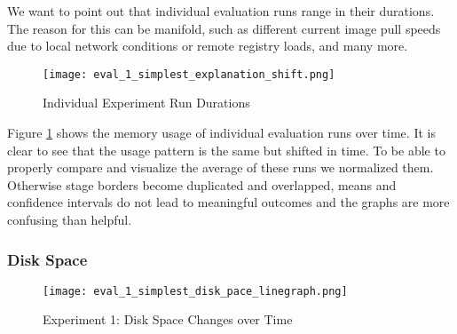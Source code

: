We want to point out that individual evaluation runs range in their durations.
The reason for this can be manifold, such as different current image pull speeds due to local network conditions or remote registry loads, and many more.
\begin{figure}[h]
    \begin{adjustwidth}{-0.2\paperwidth}{-0.2\paperwidth}
        \centering
        \texttt{[image: eval\_1\_simplest\_explanation\_shift.png]}
        \caption{Individual Experiment Run Durations}
        \label{fig:eval_1_simplest_explanation_shift}
    \end{adjustwidth}
\end{figure}
Figure \ref{fig:eval_1_simplest_explanation_shift} shows the memory usage of individual evaluation runs over time.
It is clear to see that the usage pattern is the same but shifted in time.
To be able to properly compare and visualize the average of these runs we normalized them.
Otherwise stage borders become duplicated and overlapped, means and confidence intervals do not lead to meaningful outcomes and the graphs are more confusing than helpful.

\subsubsection{Disk Space}

\begin{figure}[h]
    \begin{adjustwidth}{-0.2\paperwidth}{-0.2\paperwidth}
        \centering
        \texttt{[image: eval\_1\_simplest\_disk\_pace\_linegraph.png]}
        \caption{Experiment 1: Disk Space Changes over Time}
        \label{fig:eval_1_simplest_disk_space}
    \end{adjustwidth}
\end{figure}


